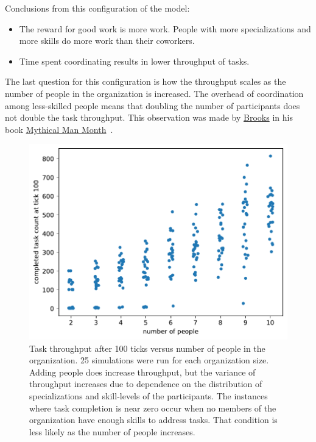 \begin{samepage}
Conclusions from this configuration of the model:
\begin{itemize}
    \item The reward for good work is more work. People with more specializations and more skills do more work than their coworkers.
    \item Time spent coordinating results in lower throughput of tasks.
\end{itemize}
\end{samepage}

The last question for this configuration is how the throughput scales as the number of people in the organization is increased.
The overhead of coordination among less-skilled people means that doubling the number of participants does not double the task throughput. This observation was made by 
\href{https://en.wikipedia.org/wiki/Fred_Brooks}{Brooks} in his book 
\href{https://en.wikipedia.org/wiki/The_Mythical_Man-Month}{Mythical Man Month}~\cite{1975_brooks}. 

\begin{figure}[!htb] %
\centering
\includegraphics[width=1\textwidth]{images/task_distribution_completed_versus_size_simCount25_skills2_levels1_taskduration1_people2_social0_ticks100.pdf}
\caption{Task throughput after 100 ticks versus number of people in the organization. 25 simulations were run for each organization size. 
Adding people does increase throughput, but the variance of throughput increases due to dependence on the distribution of specializations and skill-levels of the participants. The instances where task completion is near zero occur when no members of the organization have enough skills to address tasks. That condition is less likely as the number of people increases.
}
\label{fig:task-distribution-completed-vs-size}
\end{figure}


